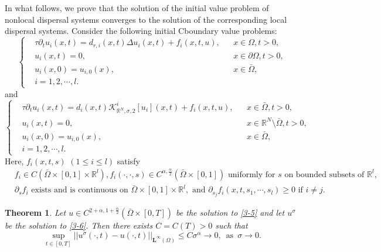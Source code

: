 \documentclass[11pt,reqno]{amsart}
\newtheorem{theorem}{Theorem}[section]
\numberwithin{equation}{section}
\begin{document}
In what follows, we prove that the solution of the initial value problem of nonlocal dispersal systems converges to the solution of the corresponding local dispersal systems.
Consider the following initial Cboundary value problems:
%
\begin{equation}\label{3-5}
\left\{
\begin{aligned}
&\tau\partial_{t}u_{i}(x,t)= d_{r,i}(x,t)\Delta u_{i}(x,t) + f_{i}(x,t,u), && x\in\Omega, t> 0,\\
&u_{i}(x,t)=0,  && x\in\partial\Omega, t>0,\\
&u_{i}(x,0)=u_{i,0}(x),  && x\in \bar\Omega,\\
&i=1,2,\cdots,l.
\end{aligned}
\right.
\end{equation}
%
and
%
\begin{equation}\label{3-6}
\left\{
\begin{aligned}
&\tau\partial_{t}u_{i}(x,t)= d_{i}(x,t)\mathcal{K}^{i}_{\mathbb{R}^{N},\sigma,2}[u_{i}](x,t) + f_{i}(x,t,u), && x\in \bar\Omega, t> 0,\\
&u_{i}(x,t)=0,  &&  x\in\mathbb{R}^{N}\setminus \bar\Omega, t>0,\\
&u_{i}(x,0)=u_{i,0}(x),  && x\in \bar\Omega,\\
&i=1,2,\cdots,l.
\end{aligned}
\right.
\end{equation}
Here, $f_{i}(x,t,s)$ $(1 \leq i \leq l)$ satisfy
\begin{align*}
&f_{i}\in C(\bar{\Omega}\times[0,1]\times \mathbb{R}^{l}),
f_{i}(\cdot,\cdot,s) \in C^{\alpha,\frac{\alpha}{2}}(\bar{\Omega}\times [0,1]) \text{ uniformly for } s \text{ on bounded subsets of } \mathbb{R}^{l},\\
&\partial_{s}f_{i} \text{ exists and is continuous on }
\bar{\Omega}\times [0,1] \times \mathbb{R}^{l}, \text{ and }\partial_{s_{j}}f_{i}(x,t,s_{1},\cdots,s_{l}) \geq 0 \text{ if } i\neq j.
\end{align*}
%
\begin{theorem}\label{THM3.4}
Let $u \in C^{2+\alpha, 1+\frac{\alpha}{2}}(\bar{\Omega}\times [0,T])$ be the solution to \eqref{3-5} and let $u^{\sigma}$ be the solution to \eqref{3-6}.
Then there exists $C=C(T)>0$ such that
\begin{equation*}
\sup_{t\in[0,T]} \left|\left| u^{\sigma}(\cdot,t) - u(\cdot,t)\right|\right|_{\mathbf{L}^{\infty}(\Omega)} \leq C\sigma^{\alpha} \to 0,
\enspace \text{as} \enspace \sigma \to 0.
\end{equation*}
\end{theorem}
\end{document}
